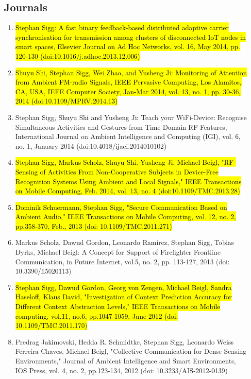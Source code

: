 \documentclass[12pt]{article}
\begin{document}
\subsection*{Journals}
\begin{enumerate}
\item \hl{Stephan Sigg: A fast binary feedback-based distributed adaptive carrier synchronisation for transmission among clusters of disconnected IoT nodes in smart spaces, Elsevier Journal on Ad Hoc Networks, vol. 16, May 2014, pp. 120-130 (doi:10.1016/j.adhoc.2013.12.006)}
\item \hl{Shuyu Shi, Stephan Sigg, Wei Zhao, and Yusheng Ji: Monitoring of Attention from Ambient FM-radio Signals, IEEE Pervasive Computing, Los Alamitos, CA, USA, IEEE Computer Society, Jan-Mar 2014, vol. 13, no. 1, pp. 30-36, 2014 (doi:10.1109/MPRV.2014.13)}
\item Stephan Sigg, Shuyu Shi and Yusheng Ji: Teach your WiFi-Device: Recognise Simultaneous Activities and Gestures from Time-Domain RF-Features, International Journal on Ambient Intelligence and Computing (IGI), vol. 6, no. 1, January 2014 (doi:10.4018/ijaci.2014010102)
\item \hl{Stephan Sigg, Markus Scholz, Shuyu Shi, Yusheng Ji, Michael Beigl, "RF-Sensing of Activities From Non-Cooperative Subjects in Device-Free Recognition Systems Using Ambient and Local Signals," IEEE Transactions on Mobile Computing, Feb. 2014, vol. 13, no. 4 (doi:10.1109/TMC.2013.28)}
\item \hl{Dominik Schuermann, Stephan Sigg, "Secure Communication Based on Ambient Audio," IEEE Transactions on Mobile Computing, vol. 12, no. 2, pp.358-370, Feb., 2013 (doi: 10.1109/TMC.2011.271)}
\item Markus Scholz, Dawud Gordon, Leonardo Ramirez, Stephan Sigg, Tobias Dyrks, Michael Beigl: A Concept for Support of Firefighter Frontline Communication, in Future Internet, vol.5, no. 2, pp. 113-127, 2013 (doi: 10.3390/fi5020113)
\item \hl{Stephan Sigg, Dawud Gordon, Georg von Zengen, Michael Beigl, Sandra Haseloff, Klaus David, "Investigation of Context Prediction Accuracy for Different Context Abstraction Levels," IEEE Transactions on Mobile computing, vol.11, no.6, pp.1047-1059, June 2012 (doi: 10.1109/TMC.2011.170)}
\item Predrag Jakimovski, Hedda R. Schmidtke, Stephan Sigg, Leonardo Weiss Ferreira Chaves, Michael Beigl, "Collective Communication for Dense Sensing Environments," Journal of Ambient Intelligence and Smart Environments, IOS Press, vol. 4, no. 2, pp.123-134, 2012 (doi: 10.3233/AIS-2012-0139)

\end{enumerate}
\end{document}
